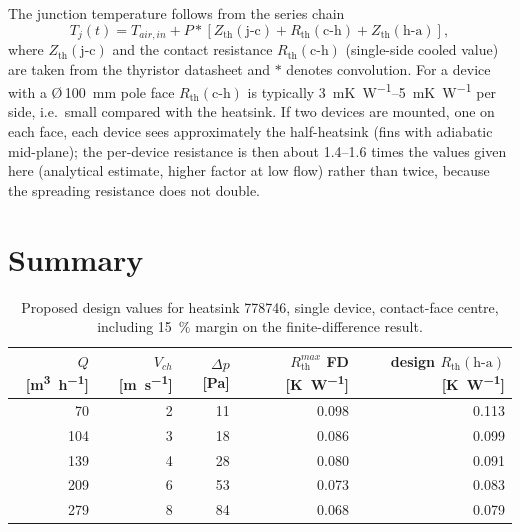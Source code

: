 \documentclass[11pt,a4paper]{article}
\newcommand{\Rth}{R_{\mathrm{th}}}
\newcommand{\Zth}{Z_{\mathrm{th}}}
\begin{document}
The junction temperature follows from the series chain
\begin{equation}
T_j(t) = T_{air,in} + P * \left[\Zth(\mathrm{j\text{-}c}) + \Rth(\mathrm{c\text{-}h}) + \Zth(\mathrm{h\text{-}a})\right],
\end{equation}
where $\Zth(\mathrm{j\text{-}c})$ and the contact resistance $\Rth(\mathrm{c\text{-}h})$ (single-side cooled value) are taken from the thyristor datasheet and $*$ denotes convolution. For a device with a \O\,\SI{100}{\milli\metre} pole face $\Rth(\mathrm{c\text{-}h})$ is typically \SIrange{3}{5}{\milli\kelvin\per\watt} per side, i.e.\ small compared with the heatsink. If two devices are mounted, one on each face, each device sees approximately the half-heatsink (fins with adiabatic mid-plane); the per-device resistance is then about 1.4--1.6 times the values given here (analytical estimate, higher factor at low flow) rather than twice, because the spreading resistance does not double.

\section{Summary}\label{sec:summary}

\begin{table}[htbp]
\centering\small
\caption{Proposed design values for heatsink 778746, single device, contact-face centre, including \SI{15}{\percent} margin on the finite-difference result.}
\label{tab:summary}
\begin{tabular}{rrrrr}
\toprule
$Q$ [\si{\cubic\metre\per\hour}] & $V_{ch}$ [\si{\metre\per\second}] & $\Delta p$ [\si{\pascal}] & $\Rth^{max}$ FD [\si{\kelvin\per\watt}] & design $\Rth(\mathrm{h\text{-}a})$ [\si{\kelvin\per\watt}] \\
\midrule
 70 & 2 & 11 & 0.098 & 0.113 \\
104 & 3 & 18 & 0.086 & 0.099 \\
139 & 4 & 28 & 0.080 & 0.091 \\
209 & 6 & 53 & 0.073 & 0.083 \\
279 & 8 & 84 & 0.068 & 0.079 \\
\bottomrule
\end{tabular}
\end{table}
\end{document}
